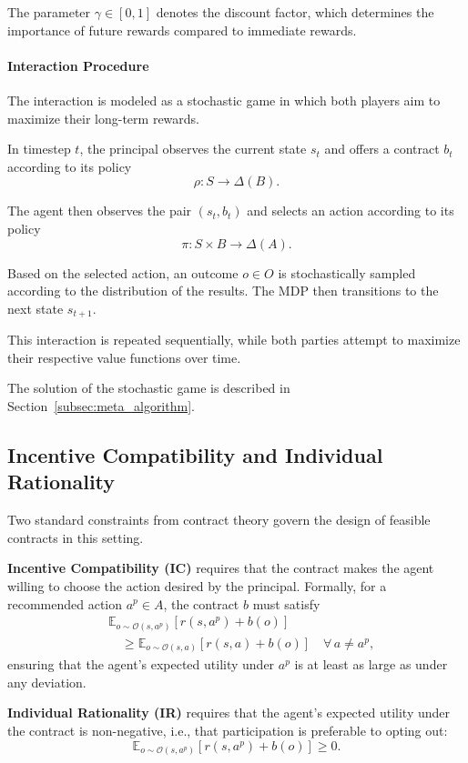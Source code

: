 \documentclass{article}
\theoremstyle{plain}
\theoremstyle{definition}
\theoremstyle{remark}
\begin{document}
The parameter $\gamma \in [0,1]$ denotes the discount factor, which determines the importance of future rewards compared to immediate rewards.

\paragraph{Interaction Procedure}
The interaction is modeled as a stochastic game in which both players aim to maximize their long-term rewards.

In timestep $t$, the principal observes the current state $s_t$ and offers a contract $b_t$ according to its policy
\[
\rho: S \xrightarrow{} \Delta(B).
\]

The agent then observes the pair $(s_t, b_t)$ and selects an action according to its policy
\[
\pi: S \times B \xrightarrow{} \Delta(A).
\]

Based on the selected action, an outcome $o \in O$ is stochastically sampled according to the distribution of the results. The MDP then transitions to the next state $s_{t+1}$.

This interaction is repeated sequentially, while both parties attempt to maximize their respective value functions over time.

The solution of the stochastic game is described in Section~\ref{subsec:meta_algorithm}.

\subsection{Incentive Compatibility and Individual Rationality}
Two standard constraints from contract theory govern the design of feasible contracts in this setting.

\textbf{Incentive Compatibility (IC)} requires that the contract makes the agent willing to choose the action desired by the principal. Formally, for a recommended action $a^p \in A$, the contract $b$ must satisfy
\[
\begin{aligned}
&\mathbb{E}_{o \sim \mathcal{O}(s,a^p)}[r(s,a^p) + b(o)] \\
&\quad \geq \mathbb{E}_{o \sim \mathcal{O}(s,a)}[r(s,a) + b(o)] \quad \forall\, a \neq a^p,
\end{aligned}
\]
ensuring that the agent's expected utility under $a^p$ is at least as large as under any deviation.

\textbf{Individual Rationality (IR)} requires that the agent's expected utility under the contract is non-negative, i.e., that participation is preferable to opting out:
\[
\mathbb{E}_{o \sim \mathcal{O}(s,a^p)}[r(s,a^p) + b(o)] \geq 0.
\]
\end{document}
